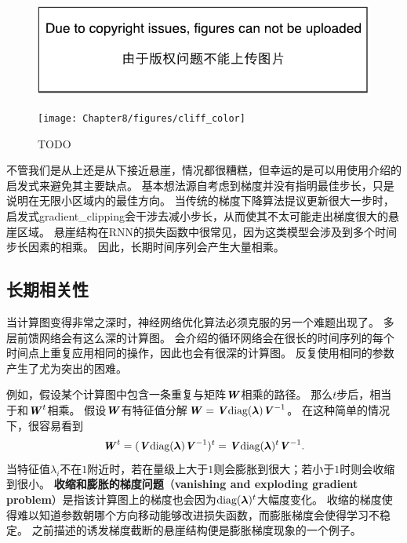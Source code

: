 \begin{figure}[!htb]
\ifOpenSource
\centerline{\includegraphics{figure.pdf}}
\else
\centerline{\texttt{[image: Chapter8/figures/cliff\_color]}}
\fi
\caption{TODO}
\label{fig:chap8_cliff}
\end{figure}


不管我们是从上还是从下接近悬崖，情况都很糟糕，但幸运的是可以用使用介绍的启发式来避免其主要缺点。
基本想法源自考虑到梯度并没有指明最佳步长，只是说明在无限小区域内的最佳方向。
当传统的梯度下降算法提议更新很大一步时，启发式\gls{gradient_clipping}会干涉去减小步长，从而使其不太可能走出梯度很大的悬崖区域。
悬崖结构在\gls{RNN}的损失函数中很常见，因为这类模型会涉及到多个时间步长因素的相乘。
因此，长期时间序列会产生大量相乘。

\subsection{长期相关性}
\label{sec:long_term_dependencies}
当计算图变得非常之深时，神经网络优化算法必须克服的另一个难题出现了。
多层前馈网络会有这么深的计算图。
会介绍的循环网络会在很长的时间序列的每个时间点上重复应用相同的操作，因此也会有很深的计算图。
反复使用相同的参数产生了尤为突出的困难。


例如，假设某个计算图中包含一条重复与矩阵$\boldsymbol{\mathit{W}}$相乘的路径。
那么$t$步后，相当于和$\boldsymbol{\mathit{W}}^t$相乘。
假设$\boldsymbol{\mathit{W}}$有特征值分解$\boldsymbol{\mathit{W}} = \boldsymbol{\mathit{V}} \text{diag}(\boldsymbol{\lambda}) \boldsymbol{\mathit{V}}^{-1}$。
在这种简单的情况下，很容易看到
\begin{equation}
  \boldsymbol{\mathit{W}}^t = (\boldsymbol{\mathit{V}} \text{diag}(\boldsymbol{\lambda}) \boldsymbol{\mathit{V}}^{-1})^t = \boldsymbol{\mathit{V}}\text{diag}(\boldsymbol{\lambda})^t  \boldsymbol{\mathit{V}}^{-1}.
\end{equation}
当特征值$\lambda_i$不在$1$附近时，若在量级上大于$1$则会膨胀到很大；若小于$1$时则会收缩到很小。
\textbf{收缩和膨胀的梯度问题}（\textbf{vanishing and exploding gradient problem}）是指该计算图上的梯度也会因为$\text{diag}(\boldsymbol{\lambda})^t$大幅度变化。
收缩的梯度使得难以知道参数朝哪个方向移动能够改进损失函数，而膨胀梯度会使得学习不稳定。
之前描述的诱发梯度截断的悬崖结构便是膨胀梯度现象的一个例子。

